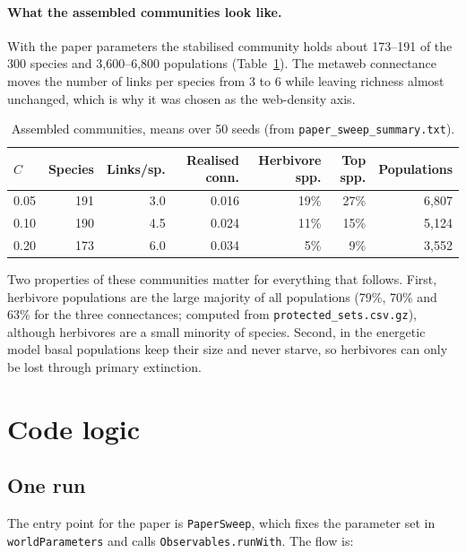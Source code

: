 \documentclass[11pt,a4paper]{article}
\newcommand{\code}[1]{\texttt{\small #1}}
\begin{document}
\paragraph{What the assembled communities look like.} With the paper parameters the stabilised community
holds about 173--191 of the 300 species and 3,600--6,800 populations (Table~\ref{tab:communities}). The
metaweb connectance moves the number of links per species from 3 to 6 while leaving richness almost
unchanged, which is why it was chosen as the web-density axis.

\begin{table}[H]
\centering
\caption{Assembled communities, means over 50 seeds (from \code{paper\_sweep\_summary.txt}).}\label{tab:communities}
\small
\begin{tabular}{@{}lrrrrrr@{}}
\toprule
$C$ & Species & Links/sp. & Realised conn. & Herbivore spp. & Top spp. & Populations \\
\midrule
0.05 & 191 & 3.0 & 0.016 & 19\% & 27\% & 6,807 \\
0.10 & 190 & 4.5 & 0.024 & 11\% & 15\% & 5,124 \\
0.20 & 173 & 6.0 & 0.034 & 5\% & 9\% & 3,552 \\
\bottomrule
\end{tabular}
\end{table}

Two properties of these communities matter for everything that follows. First, herbivore populations are
the large majority of all populations (79\%, 70\% and 63\% for the three connectances; computed from
\code{protected\_sets.csv.gz}), although herbivores are a small minority of species. Second, in the
energetic model basal populations keep their size and never starve, so herbivores can only be lost through
primary extinction.

\section{Code logic}

\subsection{One run}
The entry point for the paper is \code{PaperSweep}, which fixes the parameter set
in \code{worldParameters} and calls \code{Observables.runWith}. The flow is:
\end{document}
